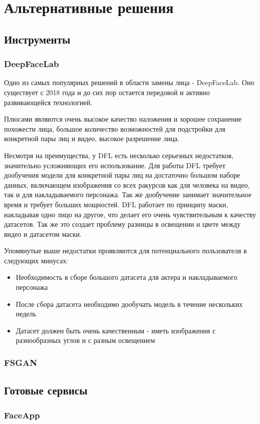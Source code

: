 \section{Альтернативные решения}

\subsection*{Инструменты}

\subsubsection{DeepFaceLab}

Одно из самых популярных решений в области замены лица - DeepFaceLab\cite{deepfacelab}. Оно существует с 2018 года и до сих пор остается передовой и активно развивающейся технологией.

Плюсами являются очень высокое качество наложения и хорошее сохранение похожести лица, большое количество возможностей для подстройки для конкретной пары лиц и видео, высокое разрешение лица.

Несмотря на преимущества, у DFL есть несколько серьезных недостатков, значительно усложняющих его использование. Для работы DFL требует дообучения модели для конкретной пары лиц на достаточно большом наборе данных, включающем изображения со всех ракурсов как для человека на видео, так и для накладываемого персонажа.
Так же дообучение занимает значительное время и требует больших мощностей.
DFL работает по принципу маски, накладывая одно лицо на другое, что делает его очень чувствительным к качеству датасетов. Так же это создает проблему разницы в освещении и цвете между видео и датасетом маски.

Упомянутые выше недостатки проявляются для потенциального пользователя в следующих минусах:
\begin{itemize}
    \item Необходимость в сборе большого датасета для актера и накладываемого персонажа
    \item После сбора датасета необходимо дообучать модель в течение нескольких недель
    \item Датасет должен быть очень качественным - иметь изображения с разнообразных углов и с разным освещением
\end{itemize}

\subsubsection{FSGAN}

\subsection*{Готовые сервисы}

\subsubsection{FaceApp}